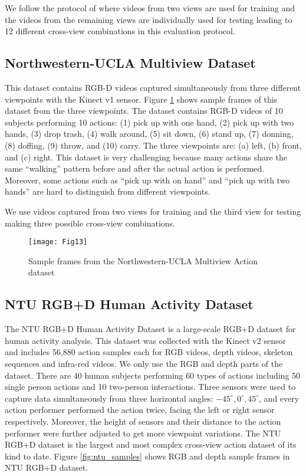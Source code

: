 \documentclass[twocolumn]{svjour3}          \smartqed  \usepackage{graphicx}
\begin{document}
We follow the protocol of \citep{HOPC2016PAMI} where videos from two views are used for training and the videos from the remaining views are individually used for testing leading to 12 different cross-view combinations in this evaluation protocol.


\subsection{Northwestern-UCLA Multiview Dataset}
This dataset \citep{AOG} contains RGB-D videos captured simultaneously from three different viewpoints with the Kinect v1 sensor. Figure \ref{fig:nucla_sample} shows sample frames of this dataset from the three viewpoints. The dataset contains RGB-D videos of 10 subjects performing 10 actions: (1) pick up with one hand, (2) pick up with two hands, (3) drop trash, (4) walk around, (5) sit down, (6) stand up, (7) donning, (8) doffing, (9) throw, and (10) carry. The three viewpoints are: (a) left, (b) front, and (c) right.  This dataset is very challenging because many actions share the same ``walking'' pattern before and after the actual action is performed. Moreover, some actions such as ``pick up with on hand'' and ``pick up with two hands'' are hard to distinguish from different viewpoints. 

We use videos captured from two views for training and the third view for testing making three possible cross-view combinations.

\begin{figure}[t]
\centering
\texttt{[image: Fig13]}
\caption{Sample frames from the Northwestern-UCLA Multiview Action dataset \citep{AOG}}
\label{fig:nucla_sample}
\end{figure}


\subsection{NTU RGB+D Human Activity Dataset}

The NTU RGB+D Human Activity Dataset \citep{shahroudy2016ntu} is a large-scale RGB+D dataset for human activity analysis. This dataset was collected with the Kinect v2 sensor and includes 56,880 action samples each for RGB videos, depth videos, skeleton sequences and infra-red videos. We only use the RGB and depth parts of the dataset. There are 40 human subjects performing 60 types of actions including 50 single person actions and 10 two-person interactions. Three sensors were used to capture data simultaneously from three horizontal angles: $-45^\circ, 0^\circ, 45^\circ$, and every action performer performed the action twice, facing the left or right sensor respectively. Moreover, the height of sensors and their distance to the action performer were further adjusted to get more viewpoint variations. The NTU RGB+D dataset is the largest and most complex cross-view action dataset of its kind to date. Figure \ref{fig:ntu_samples} shows RGB and depth sample frames in NTU RGB+D dataset.
\end{document}
